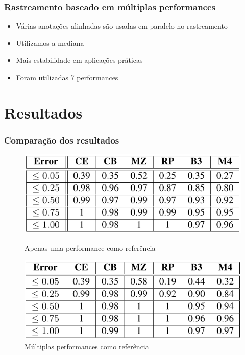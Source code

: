 \documentclass[serif,mathserif]{beamer}
\begin{document}
\begin{frame}
  \frametitle{Rastreamento baseado em múltiplas performances}
  \begin{itemize}
    \item Várias anotações alinhadas são usadas em paralelo no rastreamento\pause
    \item Utilizamos a mediana \pause %
    \item Mais estabilidade em aplicações práticas \pause
    \item Foram utilizadas 7 performances\pause %
  \end{itemize}
\end{frame}

\section{Resultados}
\begin{frame}
  \frametitle{Comparação dos resultados}

  \begin{figure}[!tbp]
    \centering
    \begin{minipage}[b]{0.45\textwidth}
      \includegraphics[width=\textwidth]{src/img/3-Table4-1.png}
      \caption*{Apenas uma performance como referência}
    \end{minipage}
    \hfill
    \begin{minipage}[b]{0.45\textwidth}
      \includegraphics[width=\textwidth]{src/img/3-Table5-1.png}
      \caption*{Múltiplas performances como referência}
    \end{minipage}
  \end{figure}
\end{frame}
\end{document}
